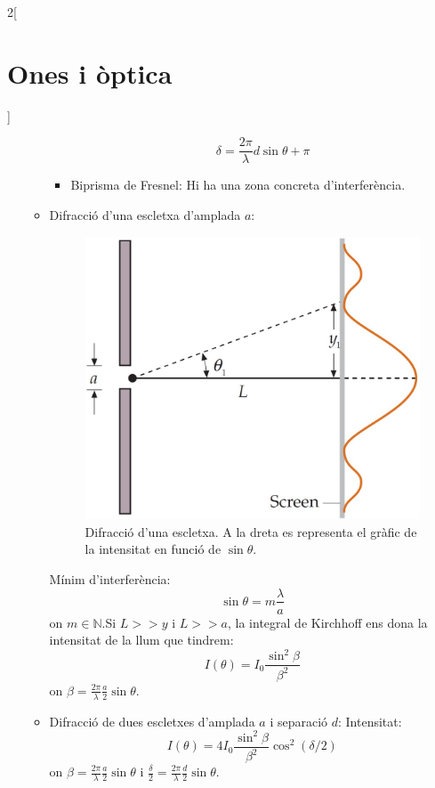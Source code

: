 \documentclass[class=article,10pt,crop=false]{standalone}
\begin{document}
\begin{multicols}{2}[\section{Ones i òptica}]
\begin{itemize}
\begin{itemize}
\begin{itemize}
\begin{figure}[ht]
            \caption{}
        \end{figure}
$$\delta=\frac{2\pi}{\lambda}d\sin\theta+\pi$$
        \item Biprisma de Fresnel: Hi ha una zona concreta d'in\-ter\-fe\-rèn\-cia.
    \end{itemize}
        \item Difracció d'una escletxa d'am\-pla\-da $a$:\newline
        \begin{figure}[ht]
            \includegraphics[width=\linewidth]{Physics/1st/Ones_i_optica/Imatges/dif1.jpg} 
            \caption{Difracció d'una escletxa. A la dreta es representa el gràfic de la intensitat en funció de $\sin\theta$.}
        \end{figure}
        Mínim d'interferència:
        $$\sin\theta=m\frac{\lambda}{a}$$ {\footnotesize on $m\in\mathbb{N}$}.\newline Si $L>>y$ i $L>>a$, la integral de Kirchhoff ens dona la intensitat de la llum que tindrem: $$I(\theta)=I_0\frac{\sin^2\beta}{\beta^2}$$ {\footnotesize on $\beta=\frac{2\pi}{\lambda}\frac{a}{2}\sin\theta$.}
        \item Difracció de dues escletxes d'am\-pla\-da $a$ i separació $d$:\newline
        Intensitat: $$I(\theta)=4I_0\frac{\sin^2\beta}{\beta^2}\cos^2(\delta/2)$$ {\footnotesize on $\beta=\frac{2\pi}{\lambda}\frac{a}{2}\sin\theta$ i $\frac{\delta}{2}=\frac{2\pi}{\lambda}\frac{d}{2}\sin\theta$.}\newline      \begin{figure}[ht]

\end{figure}
\end{itemize}
\end{itemize}
\end{multicols}
\end{document}
